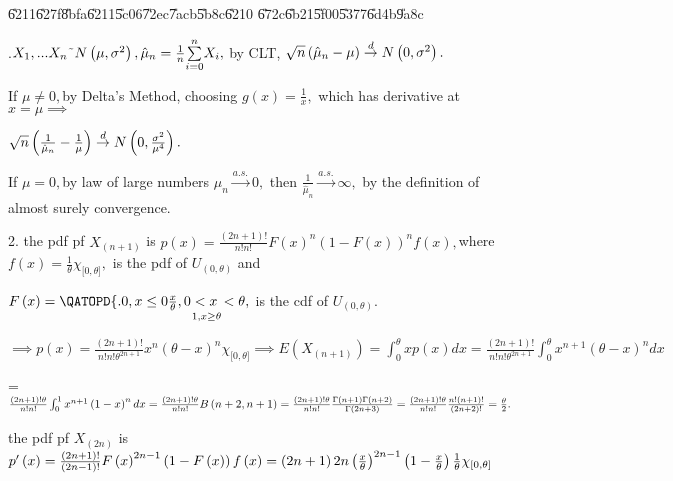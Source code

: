 \documentclass{article}
\begin{document}
\U{6211}\U{627f}\U{8bfa}\U{6211}\U{5c06}\U{72ec}\U{7acb}\U{5b8c}\U{6210}%
\U{672c}\U{6b21}\U{5f00}\U{5377}\U{6d4b}\U{9a8c}

.$X_{1},...X_{n}\symbol{126}N\left( \mu ,\sigma ^{2}\right) ,\hat{%
\mu}_{n}=\frac{1}{n}\underset{i=0}{\overset{n}{\sum }}X_{i},$ by CLT, $\sqrt{%
n}\left( \hat{\mu}_{n}-\mu \right) \overset{d}{\rightarrow }N\left( 0,\sigma
^{2}\right) .$

If $\mu \neq 0,$by Delta's Method, choosing $g\left( x\right) =\frac{1}{x},$%
which has derivative at $x=\mu \implies $

$\sqrt{n}\left( \frac{1}{\hat{\mu}_{n}}-\frac{1}{\mu }\right) \overset{d}{%
\rightarrow }N\left( 0,\frac{\sigma ^{2}}{\mu ^{4}}\right) .$

If $\mu =0,$by law of large numbers $\hat{\mu}_{n}\overset{a.s.}{\rightarrow 
}0,$ then $\frac{1}{\hat{\mu}_{n}}\overset{a.s.}{\rightarrow }\infty ,$ by
the definition of almost surely convergence.

2. the pdf pf $X_{\left( n+1\right) }$ is $p\left( x\right) =\frac{\left(
2n+1\right) !}{n!n!}F\left( x\right) ^{n}\left( 1-F\left( x\right) \right)
^{n}f\left( x\right) ,$where $f\left( x\right) =\frac{1}{\theta }\chi
_{\lbrack 0,\theta ]},$ is the pdf of $U_{\left( 0,\theta \right) }$ and

$F\left( x\right) =\QATOPD\{ . {0,x\leq 0}{\underset{1,x\geq \theta }{\frac{x%
}{\theta },0<x\,<\theta }},$ is the cdf of $U_{\left( 0,\theta \right) }.$

$\implies p\left( x\right) =\frac{\left( 2n+1\right) !}{n!n!\theta ^{2n+1}}%
x^{n}\left( \theta -x\right) ^{n}\chi _{\lbrack 0,\theta ]}\implies E\left(
X_{\left( n+1\right) }\right) =\int_{0}^{\theta }xp(x)dx=\frac{\left(
2n+1\right) !}{n!n!\theta ^{2n+1}}\int_{0}^{\theta }x^{n+1}\left( \theta
-x\right) ^{n}dx$

=$\frac{\left( 2n+1\right) !\theta }{n!n!}\int_{0}^{1}x^{n+1}\left(
1-x\right) ^{n}dx=\frac{\left( 2n+1\right) !\theta }{n!n!}B\left(
n+2,n+1\right) =\frac{\left( 2n+1\right) !\theta }{n!n!}\frac{\Gamma \left(
n+1\right) \Gamma \left( n+2\right) }{\Gamma \left( 2n+3\right) }=\frac{%
\left( 2n+1\right) !\theta }{n!n!}\frac{n!\left( n+1\right) !}{\left(
2n+2\right) !}=\frac{\theta }{2}.$

the pdf pf $X_{\left( 2n\right) }$ is $p^{\prime }\left( x\right) =\frac{%
\left( 2n+1\right) !}{\left( 2n-1\right) !}F\left( x\right) ^{2n-1}\left(
1-F\left( x\right) \right) f\left( x\right) =\left( 2n+1\right) 2n\left( 
\frac{x}{\theta }\right) ^{2n-1}\left( 1-\frac{x}{\theta }\right) \frac{1}{%
\theta }\chi _{\lbrack 0,\theta ]}$
\end{document}
